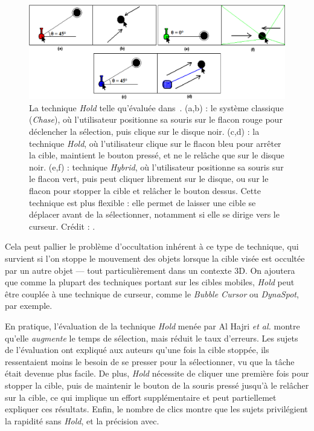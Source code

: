 \begin{appendices}
	\begin{figure}[!htbp]
		\centering
		\includegraphics[width=\textwidth]{figures/ch2/hold}
		\caption[La technique \emph{Hold}]{La technique \emph{Hold} telle qu'évaluée dans~\cite{hajri2011moving}. (a,b) : le système classique (\emph{Chase}), où l'utilisateur positionne sa souris sur le flacon rouge pour déclencher la sélection, puis clique sur le disque noir. (c,d) : la technique \emph{Hold}, où l'utilisateur clique sur le flacon bleu pour arrêter la cible, maintient le bouton pressé, et ne le relâche que sur le disque noir. (e,f) : technique \emph{Hybrid}, où l'utilisateur positionne sa souris sur le flacon vert, puis peut cliquer librement sur le disque, ou sur le flacon pour stopper la cible et relâcher le bouton dessus. Cette technique est plus flexible : elle permet de laisser une cible se déplacer avant de la sélectionner, notamment si elle se dirige vers le curseur. Crédit : \cite{hajri2011moving}.}
		\label{fig:hold}
	\end{figure}
	
	Cela peut pallier le problème d'occultation inhérent à ce type de technique, qui survient si l'on stoppe le mouvement des objets lorsque la cible visée est occultée par un autre objet --- tout particulièrement dans un contexte 3D. On ajoutera que comme la plupart des techniques portant sur les cibles mobiles, \emph{Hold} peut être couplée à une technique de curseur, comme le \emph{Bubble Cursor} ou \emph{DynaSpot}, par exemple.
	
	En pratique, l'évaluation de la technique \emph{Hold} menée par Al Hajri \emph{et al.} montre qu'elle \emph{augmente} le temps de sélection, mais réduit le taux d'erreurs. Les sujets de l'évaluation ont expliqué aux auteurs qu'une fois la cible stoppée, ils ressentaient moins le besoin de se presser pour la sélectionner, vu que la tâche était devenue plus facile. De plus, \emph{Hold} nécessite de cliquer une première fois pour stopper la cible, puis de maintenir le bouton de la souris pressé jusqu'à le relâcher sur la cible, ce qui implique un effort supplémentaire et peut partiellemet expliquer ces résultats. Enfin, le nombre de clics montre que les sujets privilégient la rapidité sans \emph{Hold}, et la précision avec.
	

\end{appendices}
